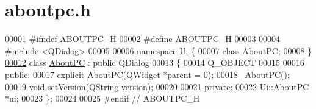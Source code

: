 \hypertarget{aboutpc_8h_source}{}\section{aboutpc.\+h}
\label{aboutpc_8h_source}

\begin{DoxyCode}
00001 \textcolor{preprocessor}{#ifndef ABOUTPC\_H}
00002 \textcolor{preprocessor}{#define ABOUTPC\_H}
00003 
00004 \textcolor{preprocessor}{#include <QDialog>}
00005 
\mbox{\hyperlink{namespace_ui}{00006}} \textcolor{keyword}{namespace }\mbox{\hyperlink{namespace_ui}{Ui}} \{
00007 \textcolor{keyword}{class }\mbox{\hyperlink{class_about_p_c}{AboutPC}};
00008 \}
\mbox{\hyperlink{class_about_p_c}{00012}} \textcolor{keyword}{class }\mbox{\hyperlink{class_about_p_c}{AboutPC}} : \textcolor{keyword}{public} QDialog
00013 \{
00014     Q\_OBJECT
00015 
00016 \textcolor{keyword}{public}:
00017     \textcolor{keyword}{explicit} \mbox{\hyperlink{class_about_p_c_a89341c4427d97da60acf15dc929ad8a6}{AboutPC}}(QWidget *parent = 0);
00018     \mbox{\hyperlink{class_about_p_c_a3cc0c4c81abc640d946003b078a47dd4}{~AboutPC}}();
00019     \textcolor{keywordtype}{void} \mbox{\hyperlink{class_about_p_c_aa3815d4826d0c8d87122449537a0a4d5}{setVersion}}(QString version);
00020 
00021 \textcolor{keyword}{private}:
00022     Ui::AboutPC *ui;
00023 \};
00024 
00025 \textcolor{preprocessor}{#endif // ABOUTPC\_H}
\end{DoxyCode}
